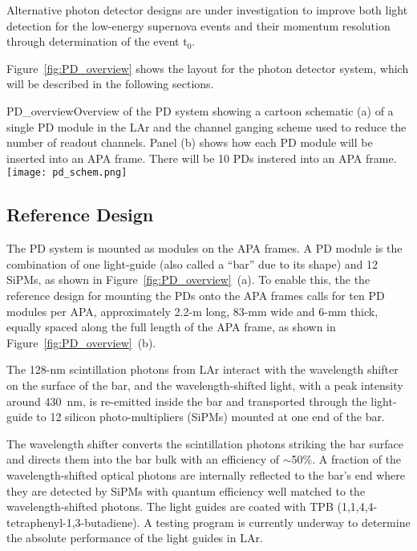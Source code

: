 Alternative photon detector designs are under investigation to improve
both light detection for the low-energy supernova events and their
momentum resolution through determination of the event t$_0$.

Figure~\ref{fig:PD_overview} shows the layout for the photon detector
system, which will be described in the following sections.
\begin{cdrfigure}{PD_overview}{Overview of the PD
    system showing a cartoon schematic (a) of a single PD module
    in the LAr and the channel ganging scheme used to reduce the
    number of readout channels. Panel (b) shows how each PD module
    will be inserted into an APA frame. There will be 10 PDs instered
    into an APA frame.}
\texttt{[image: pd\_schem.png]}
\end{cdrfigure}

\subsection{Reference Design}
\label{sec:detectors-fd-ref-pd-refsystem} 

The PD system is mounted as modules on the APA frames.  A PD module is
the combination of one light-guide (also called a ``bar'' due to its
shape) and 12 SiPMs, as shown in Figure~\ref{fig:PD_overview}~(a).  To
enable this, the the reference design for mounting the PDs onto the
APA frames calls for ten PD modules per APA, approximately 2.2-m long,
83-mm wide and 6-mm thick, equally spaced along the full length of the
APA frame, as shown in Figure~\ref{fig:PD_overview}~(b). 

The 128-nm scintillation photons from LAr interact with the wavelength
shifter on the surface of the bar, and the wavelength-shifted light,
with a peak intensity around 430~nm, is re-emitted inside the bar and
transported through the light-guide to 12 silicon photo-multipliers
(SiPMs) mounted at one end of the bar.

The wavelength shifter converts the scintillation photons striking the
bar surface and directs them into the bar bulk with an efficiency of
$\sim$50\%.  A fraction of the wavelength-shifted optical photons are
internally reflected to the bar's end where they are detected by SiPMs
with quantum efficiency well matched to the wavelength-shifted
photons. The light guides are coated with TPB
(1,1,4,4-tetraphenyl-1,3-butadiene). A testing program is currently
underway to determine the absolute performance of the light guides in
LAr.

